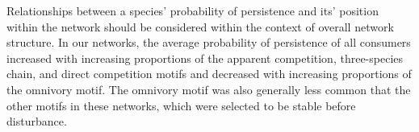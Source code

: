 \documentclass[12pt]{article}
\begin{document}
\begin{spacing}{2.0}
    
    
    
    
    
    
    
    Relationships between a species' probability of persistence and its' position within the network should be considered within the context of overall network structure.
    In our networks, the average probability of persistence of all consumers increased with increasing proportions of the apparent competition, three-species chain, and direct competition motifs and decreased with increasing proportions of the omnivory motif.
    The omnivory motif was also generally less common that the other motifs in these networks, which were selected to be stable before disturbance. 
    

\end{spacing}
\end{document}
